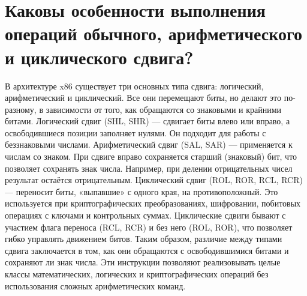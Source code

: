 
\section{Каковы особенности выполнения операций обычного, арифметического и циклического сдвига?}

В архитектуре x86 существует три основных типа сдвига: логический, арифметический и циклический.
Все они перемещают биты, но делают это по-разному, в зависимости от того, как обращаются со знаковыми и крайними битами.
Логический сдвиг (SHL, SHR) — сдвигает биты влево или вправо, а освободившиеся позиции заполняет нулями.
Он подходит для работы с беззнаковыми числами.
Арифметический сдвиг (SAL, SAR) — применяется к числам со знаком.
При сдвиге вправо сохраняется старший (знаковый) бит, что позволяет сохранять знак числа.
Например, при делении отрицательных чисел результат остаётся отрицательным.
Циклический сдвиг (ROL, ROR, RCL, RCR) — переносит биты, «выпавшие» с одного края, на противоположный.
Это используется при криптографических преобразованиях, шифровании, побитовых операциях с ключами и контрольных суммах.
Циклические сдвиги бывают с участием флага переноса (RCL, RCR) и без него (ROL, ROR), что позволяет гибко управлять движением битов.
Таким образом, различие между типами сдвига заключается в том, как они обращаются с освободившимися битами и сохраняют ли знак числа.
Эти инструкции позволяют реализовывать целые классы математических, логических и криптографических операций без использования сложных арифметических команд.

\endinput
